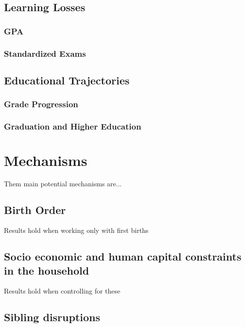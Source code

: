 \subsection{Learning Losses}

\subsubsection{GPA}

\subsubsection{Standardized Exams}

\subsection{Educational Trajectories}

\subsubsection{Grade Progression}

\subsubsection{Graduation and Higher Education}


\section{Mechanisms}\label{sec:mechanisms}

Them main potential mechanisms are...

\subsection{Birth Order}

Results hold when working only with first births

\subsection{Socio economic and human capital constraints in the household}

Results hold when controlling for these

\subsection{Sibling disruptions}

